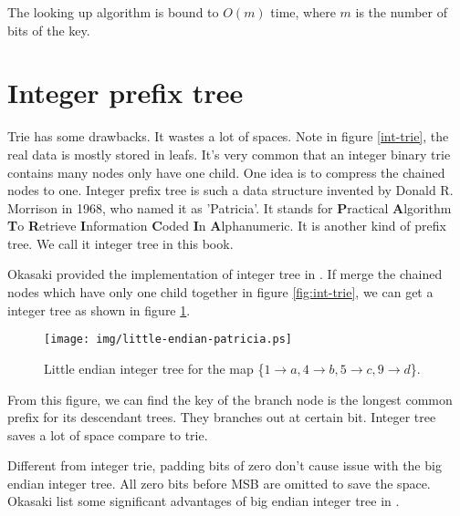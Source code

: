 \documentclass{article}
\begin{document}
The looking up algorithm is bound to $O(m)$ time, where $m$ is the
number of bits of the key.

\section{Integer prefix tree}
\label{int-patricia}

Trie has some drawbacks. It wastes a lot of
spaces. Note in figure \ref{int-trie}, the real data is mostly stored in leafs.
It's very common that an integer binary trie contains many nodes only have one child.
One idea is to compress the chained nodes to one.
Integer prefix tree is such a data structure invented by
Donald R. Morrison in 1968, who named it as 'Patricia'. It stands for \textbf{P}ractical \textbf{A}lgorithm \textbf{T}o \textbf{R}etrieve \textbf{I}nformation \textbf{C}oded \textbf{I}n \textbf{A}lphanumeric\cite{patricia-morrison}. It is another kind of prefix tree. We call it integer tree in this book.

Okasaki provided the implementation of integer tree in \cite{okasaki-int-map}.
If merge the chained nodes which have only one child together in figure \ref{fig:int-trie}, we can get a integer tree as shown in figure \ref{fig:little-endian-patricia}.

\begin{figure}[htbp]
  \centering
  \texttt{[image: img/little-endian-patricia.ps]}
  \caption{Little endian integer tree for the map
     \{$ 1 \rightarrow a, 4 \rightarrow b, 5 \rightarrow c, 9 \rightarrow d$\}.}
  \label{fig:little-endian-patricia}
\end{figure}

From this figure, we can find the key of the branch node is the
longest common prefix for its descendant trees.
They branches out at certain bit. Integer tree saves a lot of space compare
to trie.

Different from integer trie, padding bits of zero don't cause issue
with the big endian integer tree. All zero bits before MSB are omitted to
save the space. Okasaki list some significant advantages of big endian
integer tree in \cite{okasaki-int-map}.

\end{document}
